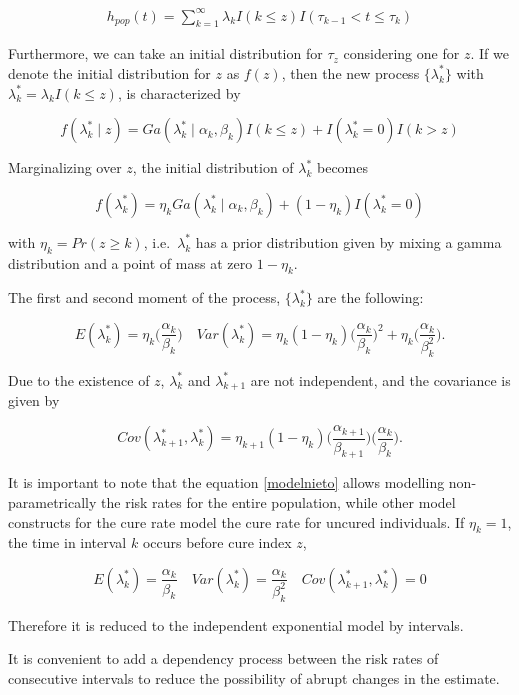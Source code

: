 \documentclass[
]{article}
\begin{document}
\begin{align}\label{apriori}
h_{pop}(t)=\sum_{k=1}^\infty \lambda_k I(k\leq z)I(\tau_{k-1}<t\leq\tau_k)
\end{align}

Furthermore, we can take an initial distribution for \(\tau_z\)
considering one for \(z\). If we denote the initial distribution for
\(z\) as \(f(z)\), then the new process \(\{\lambda_k^*\}\) with
\(\lambda_k^* = \lambda_k I (k \leq z)\), is characterized by

\[
f(\lambda_k^*\mid z) = Ga(\lambda_k^* \mid \alpha_k,\beta_k)I(k\leq z)+I(\lambda_k^*=0)I(k>z)
\]

Marginalizing over \(z\), the initial distribution of \(\lambda_k^*\)
becomes

\[
f(\lambda_k^*) = \eta_k Ga(\lambda_k^* \mid \alpha_k,\beta_k) + (1-\eta_k)I(\lambda_k^*=0)
\]

with \(\eta_k = Pr(z \geq k)\), i.e.~\(\lambda_k^*\) has a prior
distribution given by mixing a gamma distribution and a point of mass at
zero \(1- \eta_k\).

The first and second moment of the process, \(\{\lambda_k^*\}\) are the
following:

\[
E(\lambda_k^*)=\eta_k\bigg(\frac{\alpha_k}{\beta_k}\bigg) \quad
Var(\lambda_k^*)=\eta_k(1-\eta_k)\bigg(\frac{\alpha_k}{\beta_k}\bigg)^2+\eta_k\bigg(\frac{\alpha_k}{\beta_k^2}\bigg).
\]

Due to the existence of \(z\), \(\lambda_k^*\) and \(\lambda_{k + 1}^*\)
are not independent, and the covariance is given by

\[
Cov(\lambda_{k+1}^*,\lambda_k^*) = \eta_{k+1}(1-\eta_k)\bigg(\frac{\alpha_{k+1}}{\beta_{k+1}}\bigg)\bigg(\frac{\alpha_{k}}{\beta_{k}}\bigg).
\]

It is important to note that the equation \eqref{modelnieto} allows
modelling non-parametrically the risk rates for the entire population,
while other model constructs for the cure rate model the cure rate for
uncured individuals. If \(\eta_k = 1\), the time in interval \(k\)
occurs before cure index \(z\),

\[
E(\lambda_k^*)=\frac{\alpha_k}{\beta_k} \quad
Var(\lambda_k^*)=\frac{\alpha_k}{\beta_k^2} \quad
Cov(\lambda_{k+1}^*,\lambda_k^*) =0
\]

Therefore it is reduced to the independent exponential model by
intervals.

It is convenient to add a dependency process between the risk rates of
consecutive intervals to reduce the possibility of abrupt changes in the
estimate.
\end{document}

